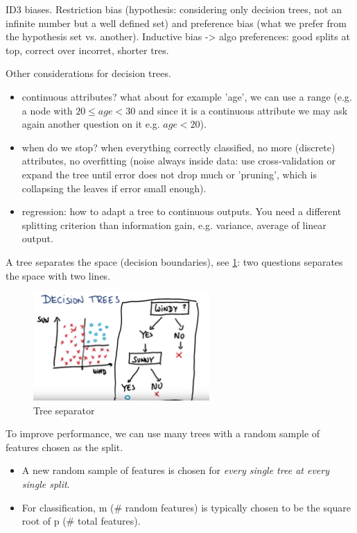 \documentclass[11pt]{article}
\begin{document}
ID3 biases. Restriction bias (hypothesis: considering only decision trees, not an infinite number but a well defined set) and preference bias (what we prefer from the hypothesis set vs. another). Inductive bias -> algo preferences: good splits at top, correct over incorret, shorter tres.

Other considerations for decision trees.
\begin{itemize}
	\item continuous attributes? what about for example 'age', we can use a range (e.g. a node with $20 \le age<30$ and since it is a continuous attribute we may ask again another question on it e.g. $age<20$).
	\item when do we stop? when everything correctly classified, no more (discrete) attributes, no overfitting (noise always inside data: use cross-validation or expand the tree until error does not drop much or 'pruning', which is collapsing the leaves if error small enough).
	\item regression: how to adapt a tree to continuous outputs. You need a different splitting criterion than information gain, e.g. variance, average of linear output.
\end{itemize}


A tree separates the space (decision boundaries), see \ref{tree_linear_separator}: two questions separates the space with two lines.
\begin{figure}[htbp] 
	\centering
	\includegraphics[width=0.6\textwidth]{pics/tree_linear_separator}
	\caption{Tree separator} 
	\label{tree_linear_separator}
\end{figure}


To improve performance, we can use many trees with a random sample of features chosen as the split.
\begin{itemize}
	\item  A new random sample of features is chosen for \textit{every single tree at every single split}.
	\item For classification, m (\# random features) is typically chosen to be the square root of p (\# total features).
\end{itemize}
\end{document}
